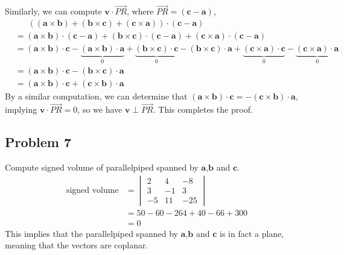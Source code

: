 \documentclass{article}
\theoremstyle{definition}
\newcommand{\vect}{\overrightarrow}
\begin{document}
Similarly, we can compute $\mathbf{v} \cdot \vect{PR}$, where $\vect{PR} = (\mathbf{c} - \mathbf{a})$,
\begin{align*}
    &\phantom{=}\ \left((\mathbf{a}\times\mathbf{b}) + (\mathbf{b}\times\mathbf{c}) + (\mathbf{c}\times\mathbf{a}) \right)
    \cdot (\mathbf{c} - \mathbf{a}) \\
    &= (\mathbf{a}\times\mathbf{b})\cdot(\mathbf{c} - \mathbf{a})
    + (\mathbf{b}\times\mathbf{c}) \cdot(\mathbf{c} - \mathbf{a})
    + (\mathbf{c}\times\mathbf{a}) \cdot(\mathbf{c} - \mathbf{a})   \\
    &= (\mathbf{a}\times\mathbf{b})\cdot\mathbf{c}
    - \underbrace{(\mathbf{a}\times\mathbf{b}) \cdot\mathbf{a}}_{0}
    + \underbrace{(\mathbf{b}\times\mathbf{c}) \cdot\mathbf{c}}_{0}
    - (\mathbf{b}\times\mathbf{c}) \cdot\mathbf{a}
    + \underbrace{(\mathbf{c}\times\mathbf{a}) \cdot\mathbf{c}}_{0}
    - \underbrace{(\mathbf{c}\times\mathbf{a}) \cdot\mathbf{a}}_{0}  \\
    &= (\mathbf{a}\times\mathbf{b})\cdot\mathbf{c}
    - (\mathbf{b}\times\mathbf{c}) \cdot\mathbf{a}  \\
    &= (\mathbf{a}\times\mathbf{b})\cdot\mathbf{c}
    + (\mathbf{c}\times\mathbf{b}) \cdot\mathbf{a}
\end{align*}
By a similar computation, we can determine that
$(\mathbf{a}\times\mathbf{b})\cdot\mathbf{c} = - (\mathbf{c}\times\mathbf{b}) \cdot\mathbf{a}$,
implying $\mathbf{v} \cdot \vect{PR} = 0$, so we have $\mathbf{v}\perp \vect{PR}$.
This completes the proof.
\hfill\qedsymbol

\subsection*{Problem 7}
Compute signed volume of parallelpiped spanned by $\mathbf{a}$,$\mathbf{b}$ and $\mathbf{c}$.
\begin{align*}
    \text{signed volume} &= \begin{vmatrix}
        2 & 4  & -8 \\
        3 & -1 & 3  \\
        -5& 11 & -25
    \end{vmatrix}   \\
    &= 50 - 60 -264 +40 -66 +300    \\
    &= 0
\end{align*}
This implies that the parallelpiped spanned by $\mathbf{a}$,$\mathbf{b}$ and $\mathbf{c}$ is in fact a plane,
meaning that the vectors are coplanar.
\hfill\qedsymbol
\end{document}
